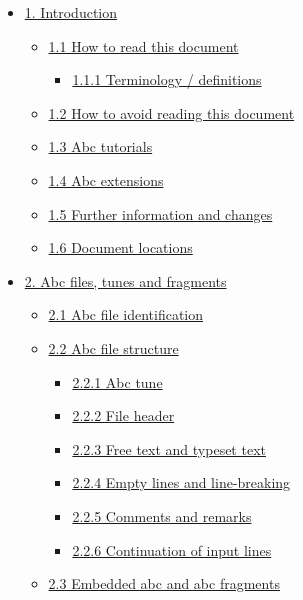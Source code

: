 \documentclass[oneside]{book}
\begin{document}
\begin{itemize}
\item
  \protect\hyperlink{introduction}{1. Introduction}

  \begin{itemize}
  \item
    \protect\hyperlink{how_to_read_this_document}{1.1 How to read this
    document}

    \begin{itemize}
    \item
      \protect\hyperlink{terminology_definitions}{1.1.1 Terminology /
      definitions}
    \end{itemize}
  \item
    \protect\hyperlink{how_to_avoid_reading_this_document}{1.2 How to
    avoid reading this document}
  \item
    \protect\hyperlink{abc_tutorials}{1.3 Abc tutorials}
  \item
    \protect\hyperlink{abc_extensions}{1.4 Abc extensions}
  \item
    \protect\hyperlink{further_information_and_changes}{1.5 Further
    information and changes}
  \item
    \protect\hyperlink{document_locations}{1.6 Document locations}
  \end{itemize}
\item
  \protect\hyperlink{abc_files_tunes_and_fragments}{2. Abc files, tunes
  and fragments}

  \begin{itemize}
  \item
    \protect\hyperlink{abc_file_identification}{2.1 Abc file
    identification}
  \item
    \protect\hyperlink{abc_file_structure}{2.2 Abc file structure}

    \begin{itemize}
    \item
      \protect\hyperlink{abc_tune}{2.2.1 Abc tune}
    \item
      \protect\hyperlink{file_header}{2.2.2 File header}
    \item
      \protect\hyperlink{free_text_and_typeset_text}{2.2.3 Free text and
      typeset text}
    \item
      \protect\hyperlink{empty_lines_and_line-breaking}{2.2.4 Empty
      lines and line-breaking}
    \item
      \protect\hyperlink{comments_and_remarks}{2.2.5 Comments and
      remarks}
    \item
      \protect\hyperlink{continuation_of_input_lines}{2.2.6 Continuation
      of input lines}
    \end{itemize}
  \item
    \protect\hyperlink{embedded_abc_and_abc_fragments}{2.3 Embedded abc
    and abc fragments}


\end{itemize}
\end{itemize}
\end{document}
